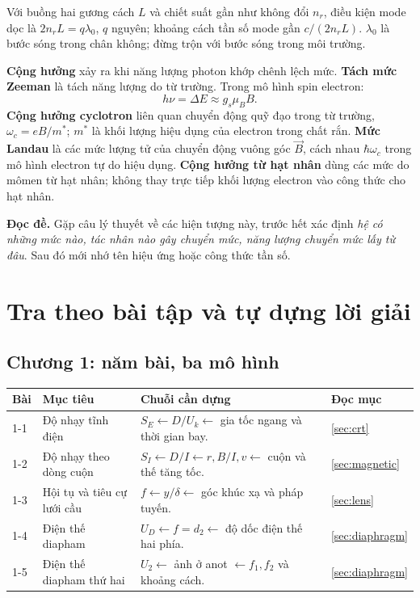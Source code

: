\documentclass[11pt,a4paper]{article}
\newcommand{\readit}[1]{\par\textbf{Đọc đề.} #1\par}
\newcommand{\chap}[1]{\par\section{#1}}
\begin{document}
Với buồng hai gương cách $L$ và chiết suất gần như không đổi $n_r$,
điều kiện mode dọc là $2n_rL=q\lambda_0$, $q$ nguyên;
khoảng cách tần số mode gần $c/(2n_rL)$.
$\lambda_0$ là bước sóng trong chân không; đừng trộn với bước sóng trong môi trường.

\textbf{Cộng hưởng} xảy ra khi năng lượng photon khớp chênh lệch mức.
\textbf{Tách mức Zeeman} là tách năng lượng do từ trường.
Trong mô hình spin electron:
\[
h\nu=\Delta E\approx g_s\mu_BB.
\]
\textbf{Cộng hưởng cyclotron} liên quan chuyển động quỹ đạo trong từ trường,
$\omega_c=eB/m^*$; $m^*$ là khối lượng hiệu dụng của electron trong chất rắn.
\textbf{Mức Landau} là các mức lượng tử của chuyển động vuông góc $\vec B$,
cách nhau $\hbar\omega_c$ trong mô hình electron tự do hiệu dụng.
\textbf{Cộng hưởng từ hạt nhân} dùng các mức do mômen từ hạt nhân;
không thay trực tiếp khối lượng electron vào công thức cho hạt nhân.

\readit{Gặp câu lý thuyết về các hiện tượng này, trước hết xác định
\emph{hệ có những mức nào, tác nhân nào gây chuyển mức, năng lượng chuyển
mức lấy từ đâu}. Sau đó mới nhớ tên hiệu ứng hoặc công thức tần số.}

\chap{Tra theo bài tập và tự dựng lời giải}\label{sec:map}
\subsection{Chương 1: năm bài, ba mô hình}
\begin{tabularx}{\textwidth}{@{}Q{1.4cm}Q{3.4cm}YQ{1.5cm}@{}}
\toprule
\textbf{Bài} & \textbf{Mục tiêu} & \textbf{Chuỗi cần dựng} & \textbf{Đọc mục}\\-1 & Độ nhạy tĩnh điện & $S_E\leftarrow D/U_k\leftarrow$ gia tốc ngang và thời gian bay. & \ref{sec:crt}\\
1-2 & Độ nhạy theo dòng cuộn & $S_I\leftarrow D/I\leftarrow r,B/I,v\leftarrow$ cuộn và thế tăng tốc. & \ref{sec:magnetic}\\
1-3 & Hội tụ và tiêu cự lưới cầu & $f\leftarrow y/\delta\leftarrow$ góc khúc xạ và pháp tuyến. & \ref{sec:lens}\\
1-4 & Điện thế diapham & $U_D\leftarrow f=d_2\leftarrow$ độ dốc điện thế hai phía. & \ref{sec:diaphragm}\\
1-5 & Điện thế diapham thứ hai & $U_2\leftarrow$ ảnh ở anot $\leftarrow f_1,f_2$ và khoảng cách. & \ref{sec:diaphragm}\\
\bottomrule
\end{tabularx}
\end{document}
